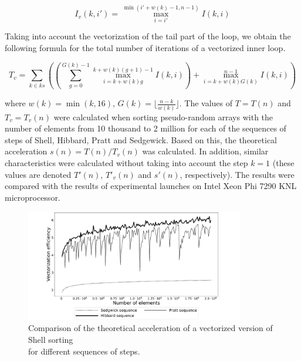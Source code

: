 \documentclass[
11pt,%
tightenlines,%
twoside,%
onecolumn,%
nofloats,%
nobibnotes,%
nofootinbib,%
superscriptaddress,%
noshowpacs,%
centertags]%
{revtex4}
\begin{document}
\begin{equation}
I_v(k, i') = \max_{i = i'}^{\min(i' + w(k) - 1, n - 1)}{I(k, i)}
\end{equation}

Taking into account the vectorization of the tail part of the loop, we obtain the following formula for the total number of iterations of a vectorized inner loop.

\begin{equation}
T_v = \sum_{k \in ks}
{
\left(
\left(
\sum_{g = 0}^{G(k) - 1}{\max_{i = k + w(k)g}^{k + w(k)(g + 1) - 1}{I(k, i)}}
\right)
+ \max_{i = k + w(k)G(k)}^{n - 1}{I(k, i)}
\right)
}
\end{equation}

where $ w (k) = \min (k, 16) $, $ G (k) = \lfloor \frac {n - k} {w (k)} \rfloor $. The values of $ T = T (n) $ and $ T_v = T_v (n) $ were calculated when sorting pseudo-random arrays with the number of elements from 10 thousand to 2 million for each of the sequences of steps of Shell, Hibbard, Pratt and Sedgewick. 
Based on this, the theoretical acceleration $ s (n) = T (n) / T_v (n) $ was calculated. 
In addition, similar characteristics were calculated without taking into account the step $ k = 1 $ (these values are denoted $ T '(n) $, $ T'_v (n) $ and $ s' (n) $, respectively). 
The results were compared with the results of experimental launches on Intel Xeon Phi 7290 KNL microprocessor.

\begin{figure}[h]
\setcaptionmargin{5mm}
\onelinecaptionsfalse
\includegraphics[width=0.85\textwidth]{pics/experimental_eff.pdf}
\caption{Comparison of the theoretical acceleration of a vectorized version of Shell sorting \\ for different sequences of steps.}\label{fig:theor_accel}
\end{figure}
\end{document}
